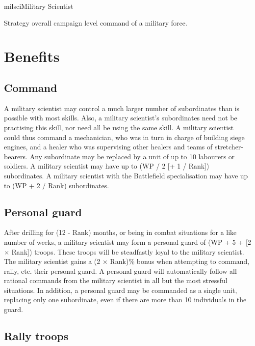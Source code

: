\begin{Skill}[2.1]{milsci}{Military Scientist}
\begin{Description}
\item[Strategy] overall campaign level command of a military force.

\end{Description}

\section{Benefits}

\subsection{Command}

A military scientist may control a much larger number of subordinates
than is possible with most skills. Also, a military scientist’s
subordinates need not be practising this skill, nor need all be using
the same skill.  A military scientist could thus command a
mechanician, who was in turn in charge of building siege engines, and
a healer who was supervising other healers and teams of
stretcher-bearers.  Any subordinate may be replaced by a unit of up to
10 labourers or soldiers. A military scientist may have up to (WP / 2
[+ 1 / Rank]) subordinates.  A military scientist with the Battlefield
specialisation may have up to (WP + 2 / Rank) subordinates.

\subsection{Personal guard}

After drilling for (12 - Rank) months, or being in combat situations
for a like number of weeks, a military scientist may form a personal
guard of (WP + 5 + [2 × Rank]) troops. These troops will be
steadfastly loyal to the military scientist. The military scientist
gains a (2 × Rank)\% bonus when attempting to command, rally, etc.
their personal guard.  A personal guard will automatically follow all
rational commands from the military scientist in all but the most
stressful situations.  In addition, a personal guard may be commanded
as a single unit, replacing only one subordinate, even if there are
more than 10 individuals in the guard.

\subsection{Rally troops}


\end{Skill}
